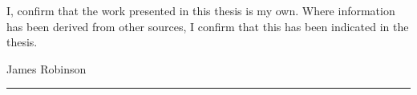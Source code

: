 I, \theauthor confirm that the work presented in this thesis is my own.
Where information has been derived from other sources, I confirm that
this has been indicated in the thesis.
\vspace*{3cm}
\begin{flushright}
James Robinson\hspace*{0.1\textwidth}\rule{0.5\textwidth}{0.25pt}
\end{flushright}
